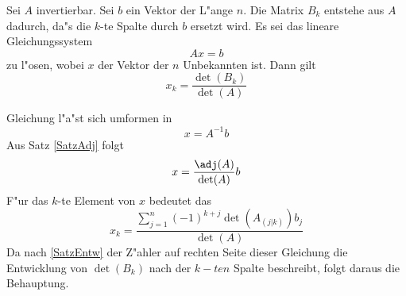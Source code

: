 \begin{satz}
\label{SatzCramer}
    Sei $A$ invertierbar. Sei $b$ ein Vektor der L"ange $n$. Die Matrix
    $B_k$ entstehe aus $A$ dadurch, da"s die $k$-te Spalte durch $b$ 
    ersetzt wird. Es sei das lineare Gleichungssystem
    \begin{equation}
    \label{Equ1SatzCramer}
        Ax=b
    \end{equation}
    zu l"osen, wobei
    $x$ der Vektor der $n$ Unbekannten ist. Dann gilt
    \[ x_k = \frac{\det(B_k)}{\det(A)} \]
\end{satz}
\begin{beweis}
    Gleichung  l"a"st sich umformen in
    \[ x= A^{-1} b \]
    Aus Satz \ref{SatzAdj} folgt
    \[ x= \frac{\adj(A)}{\det(A)}b \]
    F"ur das $k$-te Element von $x$ bedeutet das
    \begin{equation}
    \label{Equ2SatzCramer}
        x_k = \frac{\sum_{j=1}^n (-1)^{k+j} \det(A_{(j|k)}) b_j}{\det(A)}
    \end{equation}
    Da nach \ref{SatzEntw} der Z"ahler auf rechten Seite dieser
    Gleichung die Entwicklung von $\det(B_k)$ nach der
    $k-ten$ Spalte beschreibt, folgt daraus die Behauptung.
\end{beweis}

